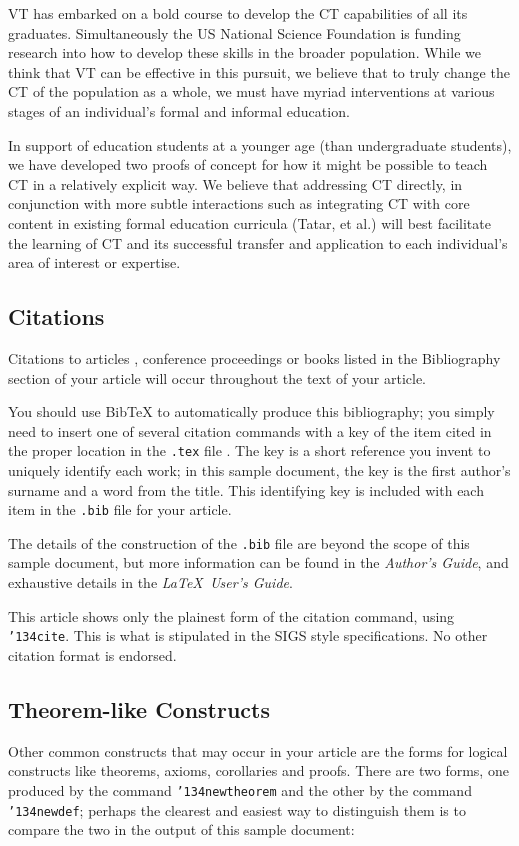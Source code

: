 \documentclass{acm_proc_article-sp}
\begin{document}
VT has embarked on a bold course to develop the CT capabilities of all its graduates. Simultaneously the US National Science Foundation is funding research into how to develop these skills in the broader population. While we think that VT can be effective in this pursuit, we believe that to truly change the CT of the population as a whole, we must have myriad interventions at various stages of an individual’s formal and informal education.

In support of education students at a younger age (than undergraduate students), we have developed two proofs of concept for how it might be possible to teach CT in a relatively explicit way. We believe that addressing CT directly, in conjunction with more subtle interactions such as integrating CT with core content in existing formal education curricula (Tatar, et al.) will best facilitate the learning of CT and its successful transfer and application to each individual’s area of interest or expertise.

\subsection{Citations}
Citations to articles \cite{bowman:reasoning, clark:pct, braams:babel, herlihy:methodology}, conference proceedings \cite{clark:pct} or books \cite{salas:calculus, Lamport:LaTeX} listed in the Bibliography section of your article will occur throughout the text of your article.

You should use BibTeX to automatically produce this bibliography; you simply need to insert one of several citation commands with a key of the item cited in the proper location in the \texttt{.tex} file \cite{Lamport:LaTeX}.  The key is a short reference you invent to uniquely identify each work; in this sample document, the key is the first author's surname and a word from the title.  This identifying key is included with each item in the \texttt{.bib} file for your article.

The details of the construction of the \texttt{.bib} file are beyond the scope of this sample document, but more information can be found in the \textit{Author's Guide}, and exhaustive details in the \textit{\LaTeX\ User's
Guide}\cite{Lamport:LaTeX}.

This article shows only the plainest form of the citation command, using \texttt{{\char'134}cite}. This is what is stipulated in the SIGS style specifications. No other citation format is endorsed.

\subsection{Theorem-like Constructs}
Other common constructs that may occur in your article are
the forms for logical constructs like theorems, axioms,
corollaries and proofs.  There are
two forms, one produced by the
command \texttt{{\char'134}newtheorem} and the
other by the command \texttt{{\char'134}newdef}; perhaps
the clearest and easiest way to distinguish them is
to compare the two in the output of this sample document:
\end{document}
